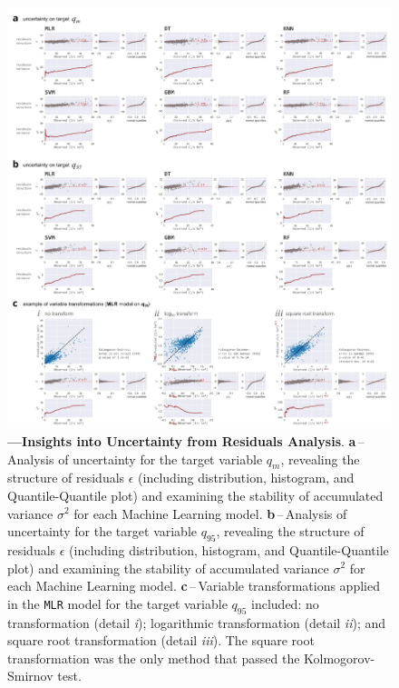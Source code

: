 \documentclass[12pt]{article}
\begin{document}
\begin{figure}[t!] %
	\centering                                       
	\includegraphics[width=0.98\linewidth]{figs/uncertainty.jpg}    
	\caption[Insights into Uncertainty]
	{\textbf{---\;Insights into Uncertainty from Residuals Analysis}.
        \textbf{a}\,--\,Analysis of uncertainty for the target variable $q_m$, revealing the structure of residuals $\epsilon$ (including distribution, histogram, and Quantile-Quantile plot) and examining the stability of accumulated variance $\sigma^2$ for each Machine Learning model.
        \textbf{b}\,--\,Analysis of uncertainty for the target variable $q_{95}$, revealing the structure of residuals $\epsilon$ (including distribution, histogram, and Quantile-Quantile plot) and examining the stability of accumulated variance $\sigma^2$ for each Machine Learning model.
        \textbf{c}\,--\,Variable transformations applied in the \texttt{MLR} model for the target variable $q_{95}$ included: no transformation (detail \textrm{\textit{i}}); logarithmic transformation (detail \textrm{\textit{ii}}); and square root transformation (detail \textrm{\textit{iii}}). The square root transformation was the only method that passed the Kolmogorov-Smirnov test.
        }
	\label{fig:uncert}  %
\end{figure}
\end{document}
